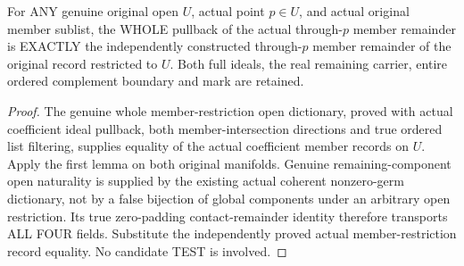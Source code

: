 \begin{theorem}
\label{hir:original-member-remainder-whole-open-naturality}
\leanok
For ANY genuine original open $U$, actual point $p\in U$, and actual original
member sublist, the WHOLE pullback of the actual through-$p$ member remainder
is EXACTLY the independently constructed through-$p$ member remainder of the
original record restricted to $U$. Both full ideals, the real remaining
carrier, entire ordered complement boundary and mark are retained.
\end{theorem}
\begin{proof}
The genuine whole member-restriction open dictionary, proved with actual
coefficient ideal pullback, both member-intersection directions and true
ordered list filtering, supplies equality of the actual coefficient member
records on $U$. Apply the first lemma on both original manifolds. Genuine
remaining-component open naturality is supplied by the existing actual
coherent nonzero-germ dictionary, not by a false bijection of global components
under an arbitrary open restriction. Its true zero-padding contact-remainder
identity therefore transports ALL FOUR fields. Substitute the independently
proved actual member-restriction record equality. No candidate TEST is involved.
\end{proof}

